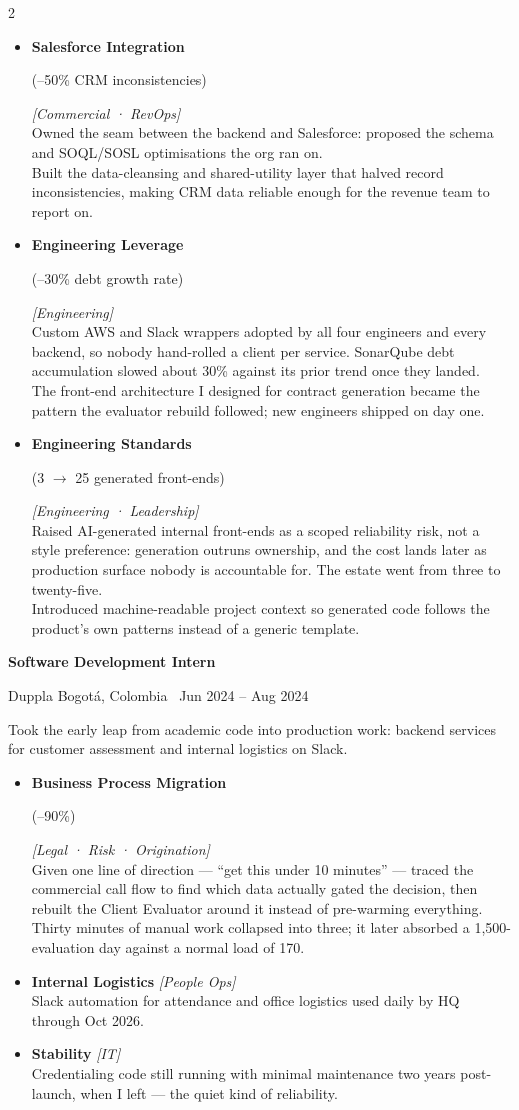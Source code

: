 \documentclass[10pt,a4paper]{article}
\newcommand{\role}[4]{%
  \needspace{4\baselineskip}%
  {\color{ink}\bfseries #1}\par
  \vspace{0.2ex}%
  {\color{navy}\small #2} \; {\color{softgray}\small #3 \textbar\ #4}\par
  \vspace{0.5ex}}
\newcommand{\metric}[1]{{\setlength{\fboxsep}{2pt}\colorbox{whisper}{\color{navy}\bfseries\strut #1}}}
\newcommand{\rolebold}[1]{{\color{navy}\bfseries #1}}
\newcommand{\stakeholders}[1]{{\color{azure}\footnotesize\textit{[#1]}}}
\newcommand{\impact}[1]{{\color{slate}\small #1}}
\newcommand{\impactnext}[1]{\\[0.4em]\impact{#1}}
\begin{document}
\begin{paracol}{2}
\begin{itemize}
  \item \rolebold{Salesforce Integration} \metric{(--50\% CRM inconsistencies)} \stakeholders{Commercial · RevOps}\\
    \impact{Owned the seam between the backend and Salesforce: proposed the schema and SOQL/SOSL optimisations the org ran on.}
    \impactnext{Built the data-cleansing and shared-utility layer that halved record inconsistencies, making CRM data reliable enough for the revenue team to report on.}
  \item \rolebold{Engineering Leverage} \metric{(--30\% debt growth rate)} \stakeholders{Engineering}\\
    \impact{Custom AWS and Slack wrappers adopted by all four engineers and every backend, so nobody hand-rolled a client per service. SonarQube debt accumulation slowed about 30\% against its prior trend once they landed.}
    \impactnext{The front-end architecture I designed for contract generation became the pattern the evaluator rebuild followed; new engineers shipped on day one.}
  \item \rolebold{Engineering Standards} \metric{(3 $\rightarrow$ 25 generated front-ends)} \stakeholders{Engineering · Leadership}\\
    \impact{Raised AI-generated internal front-ends as a scoped reliability risk, not a style preference: generation outruns ownership, and the cost lands later as production surface nobody is accountable for. The estate went from three to twenty-five.}
    \impactnext{Introduced machine-readable project context so generated code follows the product's own patterns instead of a generic template.}
\end{itemize}

\vspace{0.8ex}
\role{Software Development Intern}{Duppla}{Bogotá, Colombia}{Jun 2024 -- Aug 2024}
\impact{Took the early leap from academic code into production work: backend services for customer assessment and internal logistics on Slack.}
\begin{itemize}
  \item \rolebold{Business Process Migration} \metric{(--90\%)} \stakeholders{Legal · Risk · Origination}\\
    \impact{Given one line of direction --- ``get this under 10 minutes'' --- traced the commercial call flow to find which data actually gated the decision, then rebuilt the Client Evaluator around it instead of pre-warming everything.}
    \impactnext{Thirty minutes of manual work collapsed into three; it later absorbed a 1,500-evaluation day against a normal load of 170.}
  \item \rolebold{Internal Logistics} \stakeholders{People Ops}\\
    \impact{Slack automation for attendance and office logistics used daily by HQ through Oct 2026.}
  \item \rolebold{Stability} \stakeholders{IT}\\
    \impact{Credentialing code still running with minimal maintenance two years post-launch, when I left --- the quiet kind of reliability.}
\end{itemize}


\end{paracol}
\end{document}
